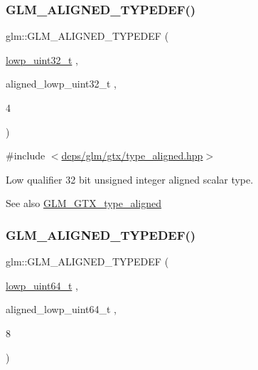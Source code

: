 \subsubsection{\texorpdfstring{G\+L\+M\+\_\+\+A\+L\+I\+G\+N\+E\+D\+\_\+\+T\+Y\+P\+E\+D\+E\+F()}{GLM\_ALIGNED\_TYPEDEF()}\hspace{0.1cm}{\footnotesize\ttfamily [75/209]}}
{\footnotesize\ttfamily glm\+::\+G\+L\+M\+\_\+\+A\+L\+I\+G\+N\+E\+D\+\_\+\+T\+Y\+P\+E\+D\+EF (\begin{DoxyParamCaption}\item[{\hyperlink{group__gtc__type__precision_ga9f8cb602a358e1f48bda2682cf051f0c}{lowp\+\_\+uint32\+\_\+t}}]{,  }\item[{aligned\+\_\+lowp\+\_\+uint32\+\_\+t}]{,  }\item[{4}]{ }\end{DoxyParamCaption})}



{\ttfamily \#include $<$\hyperlink{gtx_2type__aligned_8hpp}{deps/glm/gtx/type\+\_\+aligned.\+hpp}$>$}

Low qualifier 32 bit unsigned integer aligned scalar type. \begin{DoxySeeAlso}{See also}
\hyperlink{group__gtx__type__aligned}{G\+L\+M\+\_\+\+G\+T\+X\+\_\+type\+\_\+aligned} 
\end{DoxySeeAlso}
\mbox{\label{group__gtx__type__aligned_gaace64bddf51a9def01498da9a94fb01c}} 
\subsubsection{\texorpdfstring{G\+L\+M\+\_\+\+A\+L\+I\+G\+N\+E\+D\+\_\+\+T\+Y\+P\+E\+D\+E\+F()}{GLM\_ALIGNED\_TYPEDEF()}\hspace{0.1cm}{\footnotesize\ttfamily [76/209]}}
{\footnotesize\ttfamily glm\+::\+G\+L\+M\+\_\+\+A\+L\+I\+G\+N\+E\+D\+\_\+\+T\+Y\+P\+E\+D\+EF (\begin{DoxyParamCaption}\item[{\hyperlink{group__gtc__type__precision_gabf3069d4f188557a87b1d7f35eb0a270}{lowp\+\_\+uint64\+\_\+t}}]{,  }\item[{aligned\+\_\+lowp\+\_\+uint64\+\_\+t}]{,  }\item[{8}]{ }\end{DoxyParamCaption})}



